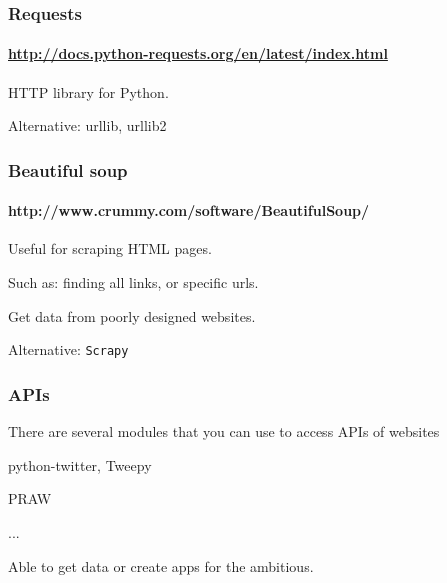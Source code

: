     \begin{frame}\frametitle{Requests}
        \framesubtitle{\url{http://docs.python-requests.org/en/latest/index.html}}

        HTTP library for Python.


        \vfill

        Alternative: urllib, urllib2

    \end{frame}


\begin{frame}\frametitle{Beautiful soup}
    \framesubtitle{http://www.crummy.com/software/BeautifulSoup/}

Useful for scraping HTML pages.

Such as: finding all links, or specific urls.

Get data from poorly designed websites.

\vfill

Alternative: \texttt{Scrapy}

\end{frame}

\begin{frame}\frametitle{APIs}

There are several modules that you can use to access APIs of websites

\begin{description}
    \item[Twitter] python-twitter, Tweepy
    \item[Reddit] PRAW
    \item ...
\end{description}

Able to get data or create apps for the ambitious.

\end{frame}








